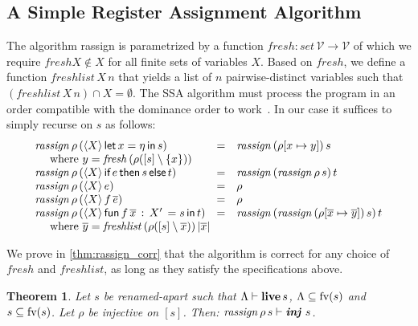 \documentclass[openright,a4paper,11pt]{scrartcl}
\newcommand{\slist}[1]{\ensuremath{\overline{#1}}}
\newcommand{\M}[1]{\ensuremath{\mathit{#1}}}
\newcommand{\indu}[1]{\ensuremath{\textbf{\textit{#1}}}}
\newcommand{\incl}{\ensuremath{\subseteq}}
\newcommand{\set}[1]{\ensuremath{\{#1\}}}
\newcommand{\Var}{\ensuremath{\mathcal{V}}}
\newcommand{\fv}{\ensuremath{\textup{fv}}}
\newcommand{\inlan}[1]{\ensuremath{\langle #1 \rangle}\,}
\newcommand{\ilIn}{\textsf{in}}
\newcommand{\ilReturn}[1]{#1}
\newcommand{\ilReturnAA}[2]{\inlan{#2}\ilReturn{#1}}
\newcommand{\ilGoto}[2]{#1\,#2}
\newcommand{\ilGotoAA}[3]{\inlan{#3}\ilGoto{#1}{#2}}
\newcommand{\ilLetRecA}[5]{\textsf{fun}\,#1\,#2\,:\,#5\,=#3\,\ilIn\,#4}
\newcommand{\ilLetRecAA}[6]{\inlan{#5}\ilLetRecA{#1}{#2}{#3}{#4}{#6}}
\newcommand{\ilLet}[3]{\textsf{let}\,#1=#2\,\ilIn\,#3}
\newcommand{\ilLetAA}[4]{\inlan{#4}\ilLet{#1}{#2}{#3}}
\newcommand{\ilIf}[3]{\textsf{if}\,{#1}\,\textsf{then}\,{#2}\,\textsf{else}\,{#3}}
\newcommand{\ilIfAA}[4]{\inlan{#4}\ilIf{#1}{#2}{#3}}
\newcommand{\freenam}[1]{\ensuremath{\fv(#1)}}
\newcommand{\G}{\ensuremath{\gamma}}
\newcommand{\LC}{\ensuremath{\Lambda}}
\newcommand{\lv}{\ensuremath{X}}
\newcommand{\livesA}[3]{\ensuremath{#1\vdash\textbf{\textup{live}}\,{}#3}}
\newcommand{\ri}[3]{\ensuremath{#1\vdash\indu{inj}~#3}}
\newcommand{\myref}[1]{\autoref{#1}}
\newcommand{\ann}[1]{#1}
\newcommand{\anni}[2]{#1\cdot#2}
\newcommand{\annii}[3]{#1\cdot#2,#3}
\theoremstyle{plain}
\newtheorem{theorem}{Theorem}
\theoremstyle{plain}
\theoremstyle{plain}
\theoremstyle{plain}
\theoremstyle{nonumberplain}
\begin{document}
\newcommand{\ra}[3]{\ensuremath{\mathit{rassign}\,#3\,#1}}
\newcommand{\freshv}{\ensuremath{\mathit{fresh}}}
\newcommand{\fresh}[1]{\ensuremath{\freshv\,#1}}
\newcommand{\freshl}[2]{\ensuremath{\mathit{freshlist}\,#1\,#2}}

\subsection{A Simple Register Assignment Algorithm}
\label{sec:ra_algo}


The algorithm \textup{rassign} is parametrized by a function $\freshv:\M{set}\,\Var\to\Var$ of which we require $\freshv{\lv}\not\in\lv$ for all finite sets of variables $\lv$.
Based on $\freshv$, we define a function $\freshl{\lv}{n}$ that yields a list of $n$ pairwise-distinct variables such that $(\freshl{\lv}{n})\cap\lv=\emptyset$.
The SSA algorithm must process the program in an order compatible with the dominance order to work~\cite{DBLP:conf/cc/HackGG06}.
In our case it suffices to simply recurse on $s$ as follows:
\[
\begin{array}{lrl}
\ra{(\ilLetAA{x}{\eta}{s}{X})}{(\anni{\G}{a})}{\rho}&=&\ra{s}{a}{(\rho[x\mapsto y])}\\
\multicolumn{3}{l}{\quad~\textup{where}~y=\fresh{(\rho ([s]\setminus\set{x}))}}\\
\ra{(\ilIfAA{e}{\sterm}{\tterm}{X})}{(\annii{\G}{a}{b})}{\rho}&=&\ra{t}{b}{(\ra{s}{a}{\rho})}\\\ra{(\ilReturnAA{e}{X})}{\ann{\G}}{\rho}&=&\rho\\
\ra{(\ilGotoAA{f}{\slist{e}}{X})}{\ann{\G}}{\rho}&=&\rho\\
\ra{(\ilLetRecAA{f}{\slist{x}}{s}{\tterm}{X}{X'})}{(\annii{\G}{a}{b})}{\rho}&=&\ra{\tterm}{b}{(\ra{s}{a}{(\rho[\slist{x}\mapsto\slist{y}])})}\\
\multicolumn{3}{l}{\quad~\textup{where}~\slist{y}=\freshl{(\rho ([s]\setminus\slist{x}))}{|\slist{x}|}}
\end{array}
\]

We prove in \myref{thm:rassign_corr} that the algorithm is correct for any choice of $\mathit{fresh}$ and $\mathit{freshlist}$,
as long as they satisfy the specifications above.

\begin{theorem}
Let $s$ be renamed-apart such that $\livesA{\LC}{}{s}$, $\LC\incl\freenam{s}$ and $s\incl\freenam{s}$.
Let $\rho$ be injective on $[s]$.
Then: $ \ri{\ra{s}{a}{\rho}}{a}{s}$.

\label{thm:rassign_corr}
\end{theorem}
\end{document}
